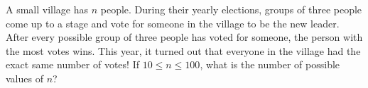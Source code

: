 A small village has $n$ people. During their yearly elections, groups of three people come up to a stage and vote for someone in the village to be the new leader. After every possible group of three people has voted for someone, the person with the most votes wins. This year, it turned out that everyone in the village had the exact same number of votes! If $10 \le n \le 100$, what is the number of possible values of $n$?
